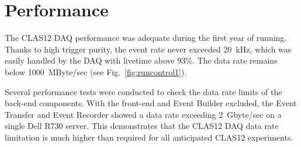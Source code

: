 \section{Performance}

The CLAS12 DAQ performance was adequate during the first year of running. Thanks to high trigger purity, the event rate never exceeded 20~kHz, which was easily handled by the DAQ with livetime above 93\%. The data rate remains below 1000~MByte/sec (see Fig.~\ref{fig:runcontrol1}).

Several performance tests were conducted to check the data rate limits of the back-end components. With the front-end and Event Builder excluded, the Event Transfer and Event Recorder showed a data rate exceeding 2~Gbyte/sec on a single Dell R730 server. This demonstrates that the CLAS12 DAQ data rate limitation is much higher than required for all anticipated CLAS12 experiments.

